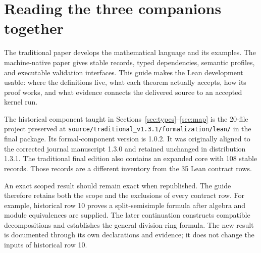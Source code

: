 \documentclass[11pt,a4paper]{article}
\newcommand{\code}[1]{\nolinkurl{#1}}
\begin{document}
\KomorebiCover
{}

\tableofcontents
\clearpage

\section{Reading the three companions together}

The traditional paper develops the mathematical language and its examples. The machine-native paper gives stable records, typed dependencies, semantic profiles, and executable validation interfaces. This guide makes the Lean development usable: where the definitions live, what each theorem actually accepts, how its proof works, and what evidence connects the delivered source to an accepted kernel run.

The historical component taught in Sections~\ref{sec:types}--\ref{sec:map} is the 20-file project preserved at \code{source/traditional_v1.3.1/formalization/lean/} in the final package. Its formal-component version is 1.0.2. It was originally aligned to the corrected journal manuscript 1.3.0 and retained unchanged in distribution 1.3.1. The traditional final edition also contains an expanded core with 108 stable records. Those records are a different inventory from the 35 Lean contract rows.

An exact scoped result should remain exact when republished. The guide therefore retains both the scope and the exclusions of every contract row. For example, historical row 10 proves a split-semisimple formula after algebra and module equivalences are supplied. The later continuation constructs compatible decompositions and establishes the general division-ring formula. The new result is documented through its own declarations and evidence; it does not change the inputs of historical row 10.
\end{document}
